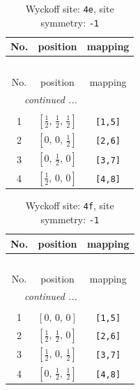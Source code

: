 \documentclass[fleqn,8pt]{jsarticle}
\begin{document}
\begin{longtable}{ccc}
\caption{Wyckoff site: {\tt 4e}, site symmetry: {\tt -1}}
 \\
 \hline \hline
No. & position & mapping \\ \hline \endfirsthead

\multicolumn{2}{l}{\tablename\ \thetable{}} \\
 \hline \hline
No. & position & mapping \\ \hline \endhead

 \hline \hline
\multicolumn{2}{r}{\footnotesize\it continued ...} \\ \endfoot

 \hline \hline
\multicolumn{2}{r}{} \\ \endlastfoot

1 & $\left[ \frac{1}{2},\, \frac{1}{2},\, \frac{1}{2} \right]$ & {\tt [1,5]} \\ \hline
2 & $\left[ 0,\, 0,\, \frac{1}{2} \right]$ & {\tt [2,6]} \\ \hline
3 & $\left[ 0,\, \frac{1}{2},\, 0 \right]$ & {\tt [3,7]} \\ \hline
4 & $\left[ \frac{1}{2},\, 0,\, 0 \right]$ & {\tt [4,8]} \\
\end{longtable}
\renewcommand{\arraystretch}{1.2}
\begin{longtable}{ccc}
\caption{Wyckoff site: {\tt 4f}, site symmetry: {\tt -1}}
 \\
 \hline \hline
No. & position & mapping \\ \hline \endfirsthead

\multicolumn{2}{l}{\tablename\ \thetable{}} \\
 \hline \hline
No. & position & mapping \\ \hline \endhead

 \hline \hline
\multicolumn{2}{r}{\footnotesize\it continued ...} \\ \endfoot

 \hline \hline
\multicolumn{2}{r}{} \\ \endlastfoot

1 & $\left[ 0,\, 0,\, 0 \right]$ & {\tt [1,5]} \\ \hline
2 & $\left[ \frac{1}{2},\, \frac{1}{2},\, 0 \right]$ & {\tt [2,6]} \\ \hline
3 & $\left[ \frac{1}{2},\, 0,\, \frac{1}{2} \right]$ & {\tt [3,7]} \\ \hline
4 & $\left[ 0,\, \frac{1}{2},\, \frac{1}{2} \right]$ & {\tt [4,8]} \\
\end{longtable}
\end{document}
